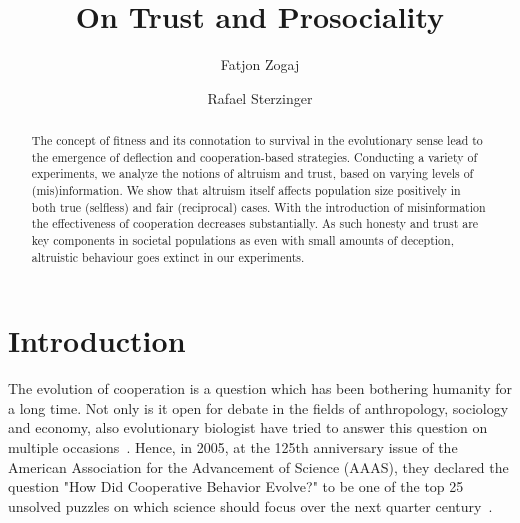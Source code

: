 \documentclass[sigconf]{acmart}
\newcommand{\todo}[1]{{\color{red}{#1}}}
\begin{document}
    \title{On Trust and Prosociality}

    \author{Fatjon Zogaj}\affiliation{}

    \author{Rafael Sterzinger}\affiliation{}

    \begin{abstract}
        The concept of fitness and its connotation to survival in the evolutionary sense lead to the emergence of deflection and cooperation-based strategies.
        Conducting a variety of experiments, we analyze the notions of altruism and trust, based on varying levels of (mis)information.
        We show that altruism itself affects population size positively in both true (selfless) and fair (reciprocal) cases.
        With the introduction of misinformation the effectiveness of cooperation decreases substantially.
        As such honesty and trust are key components in societal populations as even with small amounts of deception, altruistic behaviour goes extinct in our experiments.
    \end{abstract}

    \maketitle


    \section{Introduction}\label{sec:introduction}


    The evolution of cooperation is a question which has been bothering humanity for a long time.
    Not only is it open for debate in the fields of anthropology, sociology and economy, also evolutionary biologist have tried to answer this question on multiple occasions~\cite{gardner_theory_2009}.
    Hence, in 2005, at the 125th anniversary issue of the American Association for the Advancement of Science (AAAS), they declared the question "How Did Cooperative Behavior Evolve?" to be one of the top 25 unsolved puzzles on which science should focus over the next quarter century~\cite{aaas_125th_2005}.
\end{document}
